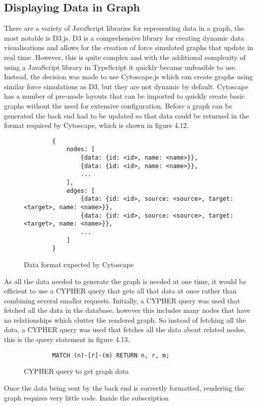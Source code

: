 \subsection{Displaying Data in Graph}
There are a variety of JavaScript libraries for representing data in a graph, the most notable is D3.js. D3 is a comprehensive library 
for creating dynamic data visualisations and allows for the creation of force simulated graphs that update in real time. However, this is 
quite complex and with the additional complexity of using a JavaScript library in TypeScript it quickly became unfeasible to use. 
Instead, the decision was made to use Cytoscape.js which can create graphs using similar force simulations as D3, but they are not 
dynamic by default. Cytoscape has a number of pre-made layouts that can be imported to quickly create basic graphs without the need for 
extensive configuration. Before a graph can be generated the back end had to be updated so that data could be returned in the format required 
by Cytoscape, which is shown in figure 4.12.
\begin{figure}[H]
    \begin{lstlisting}
        {
            nodes: [
                {data: {id: <id>, name: <name>}},
                {data: {id: <id>, name: <name>}},
                ...
            ],
            edges: [
                {data: {id: <id>, source: <source>, target: <target>, name: <name>}},
                {data: {id: <id>, source: <source>, target: <target>, name: <name>}},
                ...
            ]
        }
    \end{lstlisting}
    \caption{Data format expected by Cytoscape}
\end{figure}
As all the data needed to generate the graph is needed at one time, it would be efficient to use a CYPHER query that gets all that 
data at once rather than combining several smaller requests. Initially, a CYPHER query was used that fetched all the data in the database, however 
this includes many nodes that have no relationships which clutter the rendered graph. So instead of fetching all the data, a 
CYPHER query was used that fetches all the data about related nodes, this is the query statement in figure 4.13.
\begin{figure}[H]
    \begin{lstlisting}
        MATCH (n)-[r]-(m) RETURN n, r, m;
    \end{lstlisting}
    \caption{CYPHER query to get graph data}
\end{figure}
Once the data being sent by the back end is correctly formatted, rendering the graph requires very little code. Inside the subscription 
